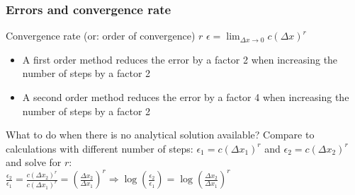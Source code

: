 % 
\begin{frame}
  \frametitle{Errors and convergence rate}
  \footnotesize\selectfont
   \begin{block}{Convergence rate (or: order of convergence) $r$}
  $\displaystyle \epsilon = \lim_{\Delta x \rightarrow 0} c(\Delta x)^r $
  \end{block}
  \begin{itemize}
    \item A first order method reduces the error by a factor 2 when increasing the number of steps by a factor 2
    \item A second order method reduces the error by a factor 4 when increasing the number of steps by a factor 2
  \end{itemize}
  What to do when there is no analytical solution available?
  \pause
  Compare to calculations with different number of steps: $\epsilon_1 = c(\Delta x_1)^r $ and $\epsilon_2 = c(\Delta x_2)^r $ and solve for $r$: \\ \vfill
  $ \displaystyle
    \frac{\epsilon_2}{\epsilon_1} = \frac{c(\Delta x_2)^r}{c(\Delta x_1)^r} = \left(\frac{\Delta x_2}{\Delta x_1}\right)^r \Rightarrow \log\left( \frac{\epsilon_2}{\epsilon_1}\right) = \log\left( \frac{\Delta x_2}{\Delta x_1}\right)^r $ 
  \vfill
\end{frame}

